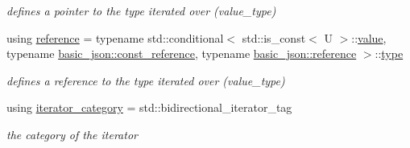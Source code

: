 \begin{DoxyCompactItemize}
\begin{DoxyCompactList}\small\item\em defines a pointer to the type iterated over (value\+\_\+type) \end{DoxyCompactList}\item 
using \hyperlink{classnlohmann_1_1basic__json_1_1iter__impl_ae09599e9cb4a947020a0265c0c4f3d5e}{reference} = typename std\+::conditional$<$ std\+::is\+\_\+const$<$ U $>$\+::\hyperlink{classnlohmann_1_1basic__json_1_1iter__impl_a2597c381f70b376336bd4faa87fadc28}{value}, typename \hyperlink{classnlohmann_1_1basic__json_a4057c5425f4faacfe39a8046871786ca}{basic\+\_\+json\+::const\+\_\+reference}, typename \hyperlink{classnlohmann_1_1basic__json_ac6a5eddd156c776ac75ff54cfe54a5bc}{basic\+\_\+json\+::reference} $>$\+::\hyperlink{classnlohmann_1_1basic__json_a2b2d781d7f2a4ee41bc0016e931cadf7}{type}\hypertarget{classnlohmann_1_1basic__json_1_1iter__impl_ae09599e9cb4a947020a0265c0c4f3d5e}{}\label{classnlohmann_1_1basic__json_1_1iter__impl_ae09599e9cb4a947020a0265c0c4f3d5e}

\begin{DoxyCompactList}\small\item\em defines a reference to the type iterated over (value\+\_\+type) \end{DoxyCompactList}\item 
using \hyperlink{classnlohmann_1_1basic__json_1_1iter__impl_adbe1b700b9cdc38f6991fc68683a9c2c}{iterator\+\_\+category} = std\+::bidirectional\+\_\+iterator\+\_\+tag\hypertarget{classnlohmann_1_1basic__json_1_1iter__impl_adbe1b700b9cdc38f6991fc68683a9c2c}{}\label{classnlohmann_1_1basic__json_1_1iter__impl_adbe1b700b9cdc38f6991fc68683a9c2c}

\begin{DoxyCompactList}\small\item\em the category of the iterator \end{DoxyCompactList}\end{DoxyCompactItemize}
